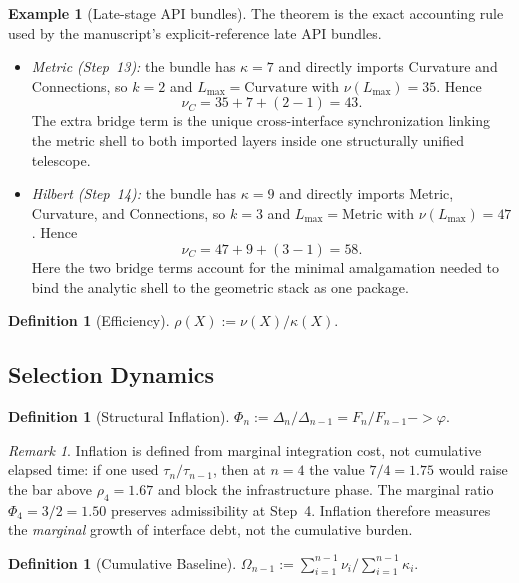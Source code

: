 \documentclass[11pt,a4paper]{article}
\def\to{->}%
\theoremstyle{plain}
\theoremstyle{definition}
\newtheorem{definition}[theorem]{Definition}
\newtheorem{example}[theorem]{Example}
\theoremstyle{remark}
\newtheorem{remark}[theorem]{Remark}
\begin{document}
\begin{example}[Late-stage API bundles]
\label{ex:telescopic-elimination}
The theorem is the exact accounting rule used by the manuscript's explicit-reference late API bundles.
\begin{itemize}[nosep]
    \item \emph{Metric (Step~13):} the bundle has $\kappa=7$ and directly imports Curvature and Connections, so $k=2$ and $L_{\max}=\mathrm{Curvature}$ with $\nu(L_{\max})=35$.  Hence
    \[
      \nu_C = 35 + 7 + (2-1) = 43.
    \]
    The extra bridge term is the unique cross-interface synchronization linking the metric shell to both imported layers inside one structurally unified telescope.
    \item \emph{Hilbert (Step~14):} the bundle has $\kappa=9$ and directly imports Metric, Curvature, and Connections, so $k=3$ and $L_{\max}=\mathrm{Metric}$ with $\nu(L_{\max})=47$.  Hence
    \[
      \nu_C = 47 + 9 + (3-1) = 58.
    \]
    Here the two bridge terms account for the minimal amalgamation needed to bind the analytic shell to the geometric stack as one package.
\end{itemize}
\end{example}

\begin{definition}[Efficiency]
\label{def:efficiency}
$\rho(X) := \nu(X) / \kappa(X)$.
\end{definition}

\subsection{Selection Dynamics}

\begin{definition}[Structural Inflation]
\label{def:inflation}
$\Phi_n := \Delta_n / \Delta_{n-1} = F_n/F_{n-1} \to \varphi$.
\end{definition}

\begin{remark}
\label{rem:phi-not-tau}
Inflation is defined from marginal integration cost, not cumulative elapsed time: if one used $\tau_n / \tau_{n-1}$, then at $n = 4$ the value $7/4 = 1.75$ would raise the bar above $\rho_4 = 1.67$ and block the infrastructure phase. The marginal ratio $\Phi_4 = 3/2 = 1.50$ preserves admissibility at Step~4. Inflation therefore measures the \emph{marginal} growth of interface debt, not the cumulative burden.
\end{remark}

\begin{definition}[Cumulative Baseline]
\label{def:omega}
$\Omega_{n-1} := \sum_{i=1}^{n-1} \nu_i / \sum_{i=1}^{n-1} \kappa_i$.
\end{definition}
\end{document}

